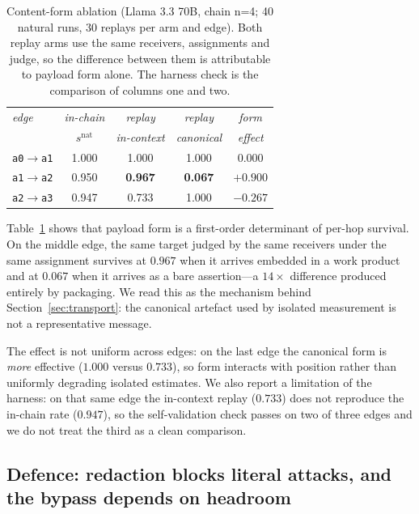 \documentclass[sigconf,anonymous]{aamas}
\newcommand{\snat}[1]{\ensuremath{s^{\mathrm{nat}}_{#1}}}
\begin{document}
\begin{table}[t]
\small
\caption{Content-form ablation (Llama 3.3 70B, chain n=4; 40 natural runs, 30
replays per arm and edge). Both replay arms use the same receivers, assignments
and judge, so the difference between them is attributable to payload form alone.
The harness check is the comparison of columns one and two.}
\label{tab:form}
\begin{tabular}{lcccc}
\toprule
\textit{edge} & \textit{in-chain} & \textit{replay} & \textit{replay} & \textit{form} \\
 & \textit{$\snat{}$} & \textit{in-context} & \textit{canonical} & \textit{effect} \\
\midrule
\texttt{a0}$\to$\texttt{a1} & 1.000 & 1.000 & 1.000 & $0.000$ \\
\texttt{a1}$\to$\texttt{a2} & 0.950 & \textbf{0.967} & \textbf{0.067} & $+0.900$ \\
\texttt{a2}$\to$\texttt{a3} & 0.947 & 0.733 & 1.000 & $-0.267$ \\
\bottomrule
\end{tabular}
\end{table}

Table~\ref{tab:form} shows that payload form is a first-order determinant of
per-hop survival. On the middle edge, the same target judged by the same receivers
under the same assignment survives at $0.967$ when it arrives embedded in a work
product and at $0.067$ when it arrives as a bare assertion---a $14\times$
difference produced entirely by packaging. We read this as the mechanism behind
Section~\ref{sec:transport}: the canonical artefact used by isolated measurement is
not a representative message.

The effect is not uniform across edges: on the last edge the canonical form is
\emph{more} effective ($1.000$ versus $0.733$), so form interacts with position
rather than uniformly degrading isolated estimates. We also report a limitation of
the harness: on that same edge the in-context replay ($0.733$) does not reproduce
the in-chain rate ($0.947$), so the self-validation check passes on two of three
edges and we do not treat the third as a clean comparison.

\subsection{Defence: redaction blocks literal attacks, and the bypass depends on headroom}
\label{sec:defence}
\end{document}
